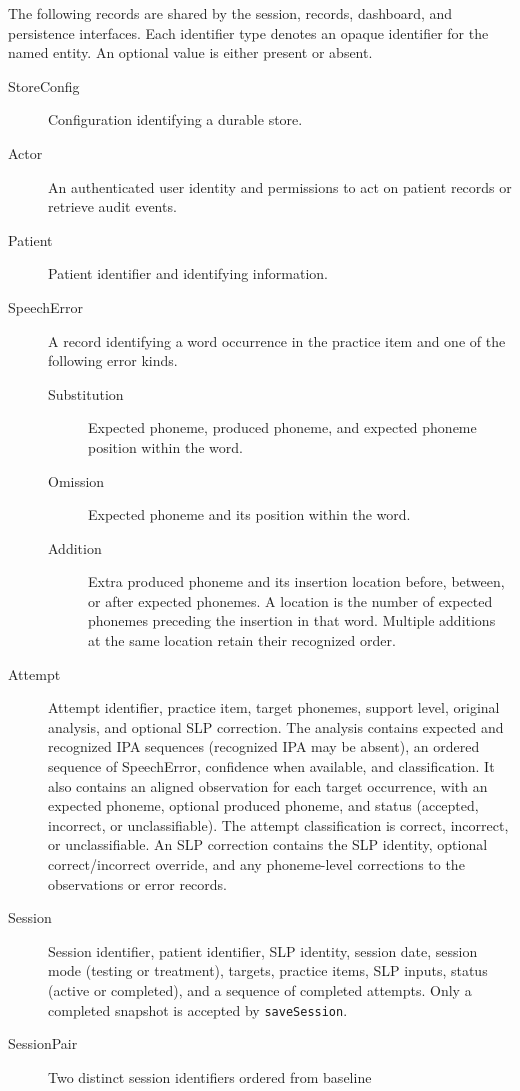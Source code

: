 \documentclass[12pt, titlepage]{article}
\begin{document}
The following records are shared by the session, records, dashboard, and
persistence interfaces. Each identifier type denotes an opaque identifier
for the named entity. An optional value is either present or absent.

\begin{description}
\item[StoreConfig] Configuration identifying a durable store.
\item[Actor] An authenticated user identity and permissions to act on patient
records or retrieve audit events.
\item[Patient] Patient identifier and identifying information.
\item[SpeechError] A record identifying a word occurrence in the practice
item and one of the following error kinds.
\begin{description}
\item[Substitution] Expected phoneme, produced phoneme, and expected
phoneme position within the word.
\item[Omission] Expected phoneme and its position within the word.
\item[Addition] Extra produced phoneme and its insertion location before,
between, or after expected phonemes. A location is the number of expected
phonemes preceding the insertion in that word. Multiple additions at the
same location retain their recognized order.
\end{description}
\item[Attempt] Attempt identifier, practice item, target phonemes, support
level, original analysis, and optional SLP correction. The analysis contains
expected and recognized IPA sequences (recognized IPA may be absent),
an ordered sequence of SpeechError, confidence when available, and
classification. It also contains an aligned observation
for each target occurrence, with an expected phoneme, optional produced
phoneme, and status (accepted, incorrect, or unclassifiable). The attempt
classification is correct, incorrect, or unclassifiable. An SLP correction
contains the SLP identity, optional correct/incorrect override, and any
phoneme-level corrections to the observations or error records.
\item[Session] Session identifier, patient identifier, SLP identity, session
date, session mode (testing or treatment), targets, practice items, SLP inputs, status (active or completed),
and a sequence of completed attempts. Only a completed snapshot is accepted
by \texttt{saveSession}.
\item[SessionPair] Two distinct session identifiers ordered from baseline

\end{description}
\end{document}
